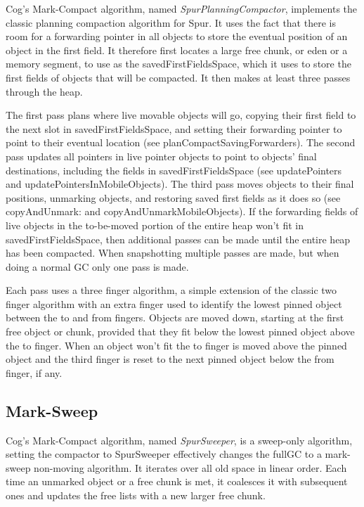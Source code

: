 \documentclass[10pt, sigplan]{acmart}
\begin{document}
Cog's Mark-Compact algorithm, named \emph{SpurPlanningCompactor}, implements the classic planning compaction algorithm for Spur.  It uses the fact that there is room for a forwarding pointer in all objects to store the eventual position of an object in the first field. It therefore first locates a large free chunk, or eden or a memory segment, to use as the savedFirstFieldsSpace, which it uses to store the first fields of objects that will be compacted. It then makes at least three passes through the heap.

The first pass plans where live movable objects will go, copying their first field to the next slot in savedFirstFieldsSpace, and setting their forwarding pointer to point to their eventual location (see planCompactSavingForwarders). The second pass updates all pointers in live pointer objects to point to objects' final destinations, including the fields in savedFirstFieldsSpace (see updatePointers and updatePointersInMobileObjects). The third pass moves objects to their final positions, unmarking objects, and restoring saved first fields as it does so (see copyAndUnmark: and copyAndUnmarkMobileObjects). If the forwarding fields of live objects in the to-be-moved portion of the entire heap won't fit in savedFirstFieldsSpace, then additional passes can be made until the entire heap has been compacted.  When snapshotting multiple passes are made, but when doing a normal GC only one pass is made.

Each pass uses a three finger algorithm, a simple extension of the classic two finger algorithm with an extra finger used to identify the lowest pinned object between the to and from fingers.  Objects are moved down, starting at the first free object or chunk, provided that they fit below the lowest pinned object above the to finger.  When an object won't fit the to finger is moved above the pinned object and the third finger is reset to the next pinned object below the from finger, if any.

\subsection{Mark-Sweep}

Cog's Mark-Compact algorithm, named \emph{SpurSweeper}, is a sweep-only algorithm, setting the compactor to SpurSweeper effectively changes the fullGC to a mark-sweep non-moving algorithm. It iterates over all old space in linear order. Each time an unmarked object or a free chunk is met, it coalesces it with subsequent ones and updates the free lists with a new larger free chunk. 
\end{document}
